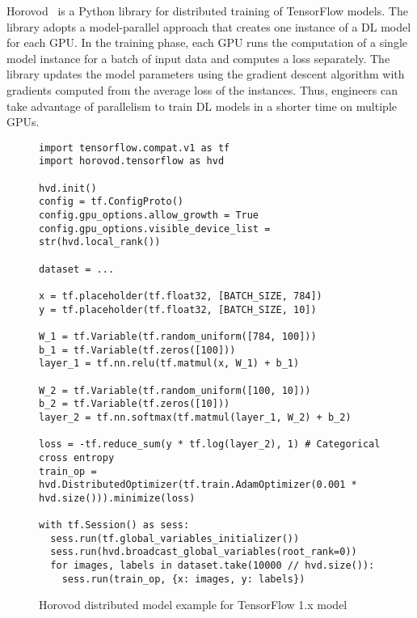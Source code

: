 Horovod~\cite{sergeev2018horovod} is a Python library for distributed training 
of TensorFlow models. 
The library adopts a model-parallel approach that creates one instance of a DL
model for each GPU.
In the training phase, each GPU runs the computation of a single model instance
for a batch of input data and computes a loss separately.
The library updates the model parameters using the gradient descent algorithm
with gradients computed from the average loss of the instances.
Thus, engineers can take advantage of parallelism to train DL models in a
shorter time on multiple GPUs.

\begin{figure}[ht!]
  \begin{lstlisting}[style=mpython]
import tensorflow.compat.v1 as tf
import horovod.tensorflow as hvd

hvd.init()
config = tf.ConfigProto()
config.gpu_options.allow_growth = True
config.gpu_options.visible_device_list = str(hvd.local_rank())

dataset = ...

x = tf.placeholder(tf.float32, [BATCH_SIZE, 784])
y = tf.placeholder(tf.float32, [BATCH_SIZE, 10]) 

W_1 = tf.Variable(tf.random_uniform([784, 100]))
b_1 = tf.Variable(tf.zeros([100]))
layer_1 = tf.nn.relu(tf.matmul(x, W_1) + b_1)

W_2 = tf.Variable(tf.random_uniform([100, 10]))
b_2 = tf.Variable(tf.zeros([10]))
layer_2 = tf.nn.softmax(tf.matmul(layer_1, W_2) + b_2)

loss = -tf.reduce_sum(y * tf.log(layer_2), 1) # Categorical cross entropy 
train_op = hvd.DistributedOptimizer(tf.train.AdamOptimizer(0.001 * hvd.size())).minimize(loss)

with tf.Session() as sess:
  sess.run(tf.global_variables_initializer())
  sess.run(hvd.broadcast_global_variables(root_rank=0))
  for images, labels in dataset.take(10000 // hvd.size()): 
    sess.run(train_op, {x: images, y: labels}) \end{lstlisting}
  \caption{Horovod distributed model example for TensorFlow 1.x model}
\label{fig:back:hvd1} 
\end{figure}

